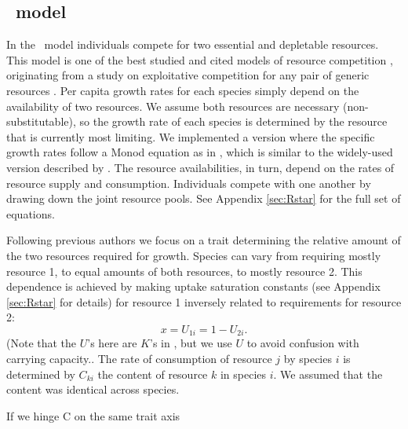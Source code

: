 \documentclass[a4paper,11pt]{article}
\begin{document}
\subsection{\Rstar\ model}

In the \Rstar\ model individuals compete for two essential and depletable resources. This model is one of the best studied and cited models of resource competition \citep{Tilman-1977, Tilman-1982,
  Huisman-2001}, originating from a study on exploitative competition for any pair of generic resources \citep{Leon-1975}. Per capita growth rates for each species simply depend on the availability of two resources.
We assume both resources are necessary (non-substitutable), so the growth rate of each species is determined by the resource that is currently most limiting.
We implemented a version where the specific growth rates follow a Monod equation as in \citet{Huisman-2001}, which is similar to the widely-used version described by \citet{Tilman-1977,
  Tilman-1982}.
The resource availabilities, in turn, depend on the rates of resource supply and consumption. Individuals compete with one another by drawing down the joint resource pools. See Appendix \ref{sec:Rstar}
for the full set of equations.

Following previous authors \citep{Tilman-1985, Schreiber-2003,
  Fox-2008} we focus on a trait determining the relative amount of the two resources required for growth. Species can vary from requiring mostly resource 1, to equal amounts of both resources, to mostly resource 2. This dependence is achieved by making uptake saturation constants (see Appendix \ref{sec:Rstar} for details) for resource 1
inversely related to requirements for resource 2:
\begin{equation}
\label{eq:R3}
x = U_{1i} = 1 - U_{2i}.
\end{equation}
(Note that the $U$'s here are $K$'s in \citet{Huisman-2001}, but we use $U$ to avoid confusion with carrying capacity..
The rate of consumption of resource $j$ by species $i$ is determined by $C_{ki}$
the content of resource $k$ in species $i$. We assumed that the content was identical across species.

If we hinge C on the same trait axis
\end{document}
